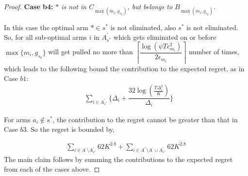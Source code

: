 \begin{proof}
\textbf{Case b4:} \textit{${*}$ is not in $C_{\max(m_{i},g_{s_{k}})}$, but belongs to $B_{\max(m_{i},g_{s_{k}})}$.}

In this case the optimal arm ${*}\in s^{*}$ is not eliminated, also $s^{*}$ is not eliminated. So, for all sub-optimal arms $i$ in $A_{s^*}^{'}$ which gets eliminated on or before $\max \lbrace m_{i},g_{s_{k}} \rbrace$ will get pulled no more than $ \left\lceil\dfrac{\log{(\psi T\epsilon_{m_{i}}^{2})}}{2\epsilon_{m_{i}}}\right\rceil$ number of times, which leads to the following bound the contribution to the expected regret, as in Case $b1$:
\begin{align*}
 &\sum_{i\in A_{s^*}^{'}}\bigg\lbrace \Delta_{i}+\dfrac{32\log{(\frac{T\Delta_i^2}{K})}}{\Delta_{i}} \bigg\rbrace 
\end{align*} 

For arms $a_i \notin s^*$, the contribution to the regret cannot be greater than that in Case $b3$. So the regret is bounded by,

\begin{align*}
\sum_{i\in A^{'}\setminus A_{s^*}^{'}} 62K^{2.8} +\sum_{i\in A^{''}\setminus A^{'} \cup A_{s^*}^{'}} 62K^{2.8}
\end{align*}
The main claim follows by summing the contributions to the expected regret from each of the cases above.
\end{proof}
